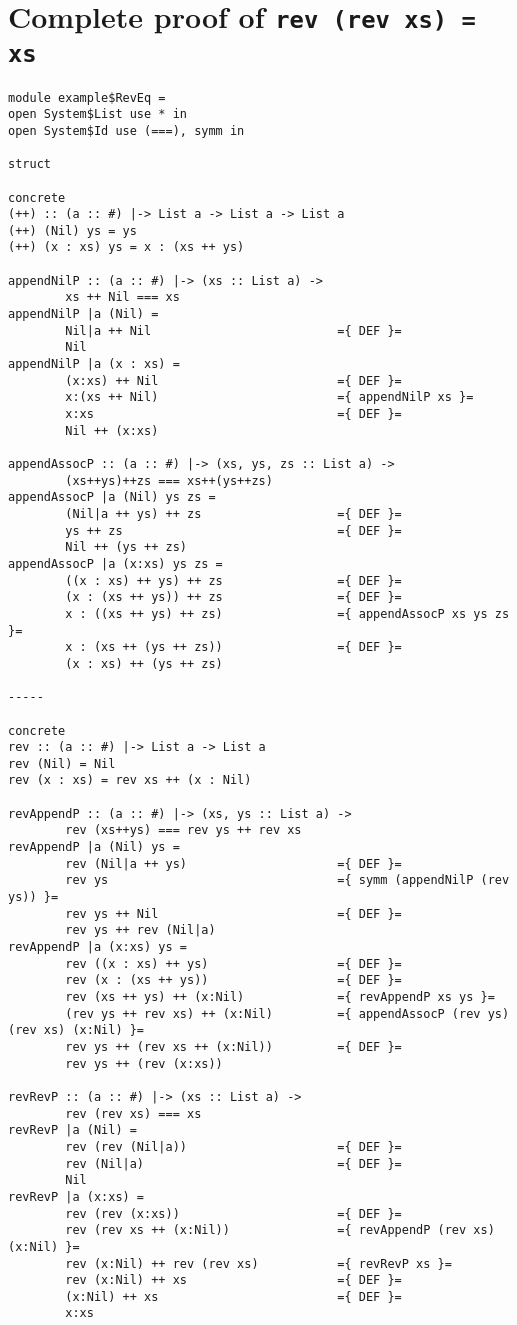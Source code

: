 \documentclass{llncs}[12pt]             %
\newcommand{\te}[1]{{\tt #1}}
\begin{document}
\section{Complete proof of \te{rev (rev xs) = xs}}
{
\small
\begin{verbatim}
module example$RevEq =
open System$List use * in
open System$Id use (===), symm in

struct

concrete
(++) :: (a :: #) |-> List a -> List a -> List a
(++) (Nil) ys = ys
(++) (x : xs) ys = x : (xs ++ ys)

appendNilP :: (a :: #) |-> (xs :: List a) -> 
        xs ++ Nil === xs
appendNilP |a (Nil) =
        Nil|a ++ Nil                          ={ DEF }=
        Nil
appendNilP |a (x : xs) =
        (x:xs) ++ Nil                         ={ DEF }=
        x:(xs ++ Nil)                         ={ appendNilP xs }=
        x:xs                                  ={ DEF }=
        Nil ++ (x:xs)

appendAssocP :: (a :: #) |-> (xs, ys, zs :: List a) -> 
        (xs++ys)++zs === xs++(ys++zs)
appendAssocP |a (Nil) ys zs =
        (Nil|a ++ ys) ++ zs                   ={ DEF }=
        ys ++ zs                              ={ DEF }=
        Nil ++ (ys ++ zs)
appendAssocP |a (x:xs) ys zs =
        ((x : xs) ++ ys) ++ zs                ={ DEF }=
        (x : (xs ++ ys)) ++ zs                ={ DEF }=
        x : ((xs ++ ys) ++ zs)                ={ appendAssocP xs ys zs }=
        x : (xs ++ (ys ++ zs))                ={ DEF }=
        (x : xs) ++ (ys ++ zs)

-----

concrete
rev :: (a :: #) |-> List a -> List a
rev (Nil) = Nil
rev (x : xs) = rev xs ++ (x : Nil)

revAppendP :: (a :: #) |-> (xs, ys :: List a) -> 
        rev (xs++ys) === rev ys ++ rev xs
revAppendP |a (Nil) ys =
        rev (Nil|a ++ ys)                     ={ DEF }=
        rev ys                                ={ symm (appendNilP (rev ys)) }=
        rev ys ++ Nil                         ={ DEF }=
        rev ys ++ rev (Nil|a)
revAppendP |a (x:xs) ys =
        rev ((x : xs) ++ ys)                  ={ DEF }=
        rev (x : (xs ++ ys))                  ={ DEF }=
        rev (xs ++ ys) ++ (x:Nil)             ={ revAppendP xs ys }=
        (rev ys ++ rev xs) ++ (x:Nil)         ={ appendAssocP (rev ys) (rev xs) (x:Nil) }=
        rev ys ++ (rev xs ++ (x:Nil))         ={ DEF }=
        rev ys ++ (rev (x:xs))

revRevP :: (a :: #) |-> (xs :: List a) -> 
        rev (rev xs) === xs
revRevP |a (Nil) =
        rev (rev (Nil|a))                     ={ DEF }=
        rev (Nil|a)                           ={ DEF }=
        Nil
revRevP |a (x:xs) =
        rev (rev (x:xs))                      ={ DEF }=
        rev (rev xs ++ (x:Nil))               ={ revAppendP (rev xs) (x:Nil) }=
        rev (x:Nil) ++ rev (rev xs)           ={ revRevP xs }=
        rev (x:Nil) ++ xs                     ={ DEF }=
        (x:Nil) ++ xs                         ={ DEF }=
        x:xs
\end{verbatim}
}
\end{document}
